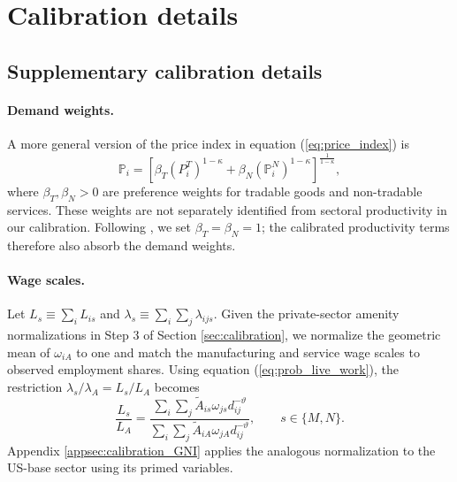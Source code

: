 \documentclass[12pt, unicode, a4paper]{article}
\newcommand{\1}{\mbox{1}\hspace{-0.25em}\mbox{l}} %
\begin{document}
\clearpage

\section{Calibration details}\label{appsec:calibration}

\subsection{Supplementary calibration details}
\label{appsec:calibration_supplement}

\paragraph{Demand weights.}
A more general version of the price index in equation (\ref{eq:price_index}) is
\begin{equation*}
    \mathbb{P}_{i}=
    \left[
        \beta_T(P_i^T)^{1-\kappa}
        +\beta_N(\mathbb{P}_{i}^N)^{1-\kappa}
    \right]^{\frac{1}{1-\kappa}},
\end{equation*}
where $\beta_T,\beta_N>0$ are preference weights for tradable goods and non-tradable services.
These weights are not separately identified from sectoral productivity in our calibration.
Following , we set $\beta_T=\beta_N=1$; the calibrated productivity terms therefore also absorb the demand weights.

\paragraph{Wage scales.}
Let $L_s\equiv\sum_i L_{is}$ and $\lambda_s\equiv\sum_i\sum_j\lambda_{ijs}$.
Given the private-sector amenity normalizations in Step 3 of Section \ref{sec:calibration}, we normalize the geometric mean of $\omega_{iA}$ to one and match the manufacturing and service wage scales to observed employment shares.
Using equation (\ref{eq:prob_live_work}), the restriction $\lambda_s/\lambda_A=L_s/L_A$ becomes
\begin{equation}
\label{eq:emp_ratio_AM}
    \frac{L_s}{L_A}
    =\frac{\sum_i\sum_j\widetilde{A}_{is}\omega_{js}d_{ij}^{-\vartheta}}
    {\sum_i\sum_j\widetilde{A}_{iA}\omega_{jA}d_{ij}^{-\vartheta}},
    \qquad s\in\{M,N\}.
\end{equation}
Appendix \ref{appsec:calibration_GNI} applies the analogous normalization to the US-base sector using its primed variables.
\end{document}
